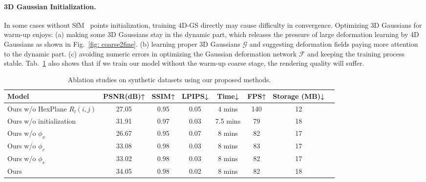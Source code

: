 \documentclass[10pt,twocolumn,letterpaper]{article}
\begin{document}
\paragraph{3D Gaussian Initialization.}
In some cases without SfM~\cite{schonberger2016structure} points initialization, training 4D-GS directly may cause difficulty in convergence. Optimizing 3D Gaussians for warm-up enjoys: (a) making some 3D Gaussians stay in the dynamic part, which releases the pressure of large deformation learning by 4D Gaussians as shown in Fig.~\ref{fig: coarse2fine}. (b) learning proper 3D Gaussians $\mathcal{G}$ and suggesting deformation fields paying more attention to the dynamic part. 
(c) avoiding numeric errors in optimizing the Gaussian deformation network $\mathcal{F}$ and keeping the training process stable. Tab.~\ref{table_ab} also shows that if we train our model without the warm-up coarse stage, the rendering quality will suffer.
\begin{table} 
\centering
\caption{Ablation studies on synthetic datasets using our proposed methods.}
\begin{tabular}{l|ccc|c|ccc} 
\toprule
Model  & PSNR(dB)↑ & SSIM↑ & LPIPS↓ & Time↓ &FPS↑& Storage (MB)↓&\\
\midrule 
Ours w/o HexPlane $R_l(i,j)$ & 27.05 & 0.95 & 0.05& \cellcolor{pink}4 mins &\cellcolor{pink}140 &\cellcolor{pink}12 \\ 
Ours w/o initialization  &31.91 & 0.97 & 0.03&\cellcolor{yellow}7.5 mins& 79&18 \\ 
Ours w/o $\phi_x$ &26.67&0.95&0.07&8 mins&82&17\\
Ours w/o $\phi_r$ &33.08\cellcolor{yellow}&\cellcolor{yellow}0.98&\cellcolor{yellow}0.03&8 mins&83\cellcolor{yellow}&\cellcolor{yellow}17\\
Ours w/o $\phi_s$ &33.02&0.98&0.03&8 mins&82&17\\ 
Ours & \cellcolor{pink}34.05&\cellcolor{pink}0.98 &\cellcolor{pink}0.02&8 mins&82 &18 \\

\bottomrule
\end{tabular}  
\label{table_ab}
\vspace{-10pt}
\end{table}
\end{document}
